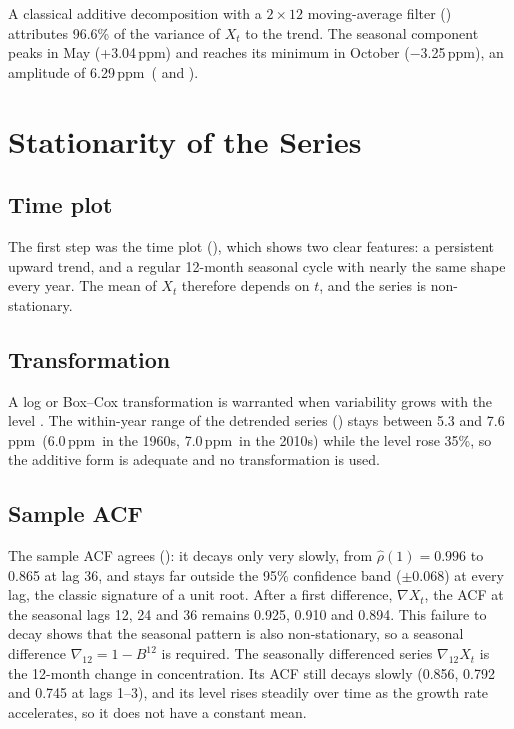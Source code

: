 \documentclass[11pt,letterpaper]{article}
\newcommand{\ppm}{\,ppm}
\newcommand{\nab}{\nabla}
\begin{document}
A classical additive decomposition with a $2\times12$ moving-average filter \citep{brockwell2016} () attributes 96.6\% of the variance of $X_t$ to the trend. The seasonal component peaks in May (+3.04\ppm) and reaches its minimum in October ($-$3.25\ppm), an amplitude of 6.29\ppm\ ( and ).

\section{Stationarity of the Series}
\subsection{Time plot}
The first step was the time plot (), which shows two clear features: a persistent upward trend, and a regular 12-month seasonal cycle with nearly the same shape every year. The mean of $X_t$ therefore depends on $t$, and the series is non-stationary.

\subsection{Transformation}
A log or Box--Cox transformation is warranted when variability grows with the level \citep{brockwell2016}. The within-year range of the detrended series () stays between 5.3 and 7.6\ppm\ (6.0\ppm\ in the 1960s, 7.0\ppm\ in the 2010s) while the level rose 35\%, so the additive form is adequate and no transformation is used.

\subsection{Sample ACF}
The sample ACF agrees (): it decays only very slowly, from $\hat\rho(1) = 0.996$ to 0.865 at lag 36, and stays far outside the 95\% confidence band ($\pm0.068$) at every lag, the classic signature of a unit root. After a first difference, $\nab X_t$, the ACF at the seasonal lags 12, 24 and 36 remains 0.925, 0.910 and 0.894. This failure to decay shows that the seasonal pattern is also non-stationary, so a seasonal difference $\nab_{12} = 1-B^{12}$ is required. The seasonally differenced series $\nab_{12}X_t$ is the 12-month change in concentration. Its ACF still decays slowly (0.856, 0.792 and 0.745 at lags 1--3), and its level rises steadily over time as the growth rate accelerates, so it does not have a constant mean.
\end{document}

